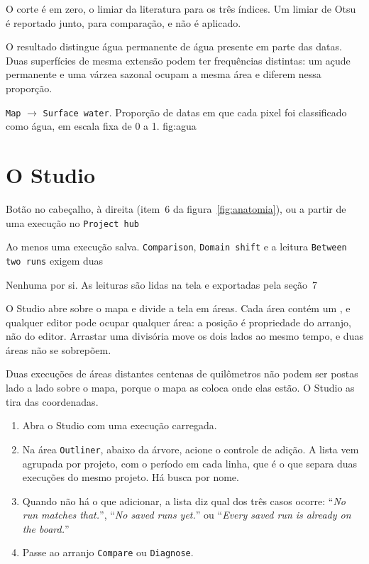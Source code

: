 \documentclass[12pt,a4paper]{article}
\newcommand{\msg}[1]{``\textit{#1}''}
\begin{document}
O corte \'e em zero, o limiar da literatura para os tr\^es \'indices. Um limiar
de Otsu \'e reportado junto, para compara\c{c}\~ao, e n\~ao \'e aplicado.

O resultado distingue \'agua permanente de \'agua presente em parte das datas.
Duas superf\'icies de mesma extens\~ao podem ter frequ\^encias distintas: um
a\c{c}ude permanente e uma v\'arzea sazonal ocupam a mesma \'area e diferem
nessa propor\c{c}\~ao.

  {\texttt{Map} $\rightarrow$ \texttt{Surface water}. Propor\c{c}\~ao de datas
   em que cada pixel foi classificado como \'agua, em escala fixa de 0 a 1.}
  {fig:agua}

\section{O Studio}

\begin{ficha}
  \item[Como abrir] Bot\~ao no cabe\c{c}alho, \`a direita (item~6 da
        figura~\ref{fig:anatomia}), ou a partir de uma execu\c{c}\~ao no
        \texttt{Project hub}
  \item[Pr\'e-condi\c{c}\~oes] Ao menos uma execu\c{c}\~ao salva.
        \texttt{Comparison}, \texttt{Domain shift} e a leitura
        \texttt{Between two runs} exigem duas
  \item[Sa\'ida] Nenhuma por si. As leituras s\~ao lidas na tela e exportadas
        pela se\c{c}\~ao~7
\end{ficha}

O Studio abre sobre o mapa e divide a tela em \'areas. Cada \'area cont\'em um
, e qualquer editor pode ocupar qualquer \'area: a
posi\c{c}\~ao \'e propriedade do arranjo, n\~ao do editor. Arrastar uma
divis\'oria move os dois lados ao mesmo tempo, e duas \'areas n\~ao se
sobrep\~oem.

 Duas execu\c{c}\~oes de \'areas distantes centenas de
quil\^ometros n\~ao podem ser postas lado a lado sobre o mapa, porque o mapa as
coloca onde elas est\~ao. O Studio as tira das coordenadas.


\begin{enumerate}[leftmargin=*,itemsep=.3em]
  \item Abra o Studio com uma execu\c{c}\~ao carregada.
  \item Na \'area \texttt{Outliner}, abaixo da \'arvore, acione o controle de
        adi\c{c}\~ao. A lista vem agrupada por projeto, com o per\'iodo em cada
        linha, que \'e o que separa duas execu\c{c}\~oes do mesmo projeto. H\'a busca por nome.
  \item Quando n\~ao h\'a o que adicionar, a lista diz qual dos tr\^es casos
        ocorre: \msg{No run matches that.}, \msg{No saved runs yet.} ou
        \msg{Every saved run is already on the board.}
  \item Passe ao arranjo \texttt{Compare} ou \texttt{Diagnose}.
\end{enumerate}
\end{document}
